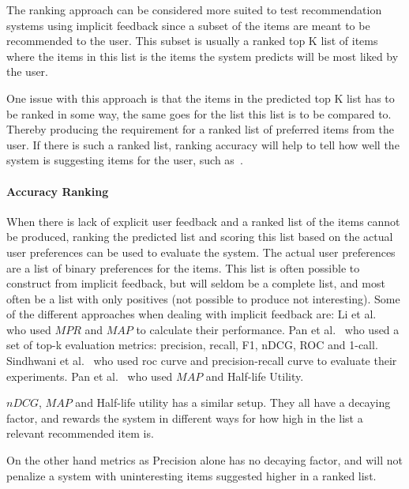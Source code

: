 The ranking approach can be considered more suited to test recommendation
systems using implicit feedback since a subset of the items are meant to be
recommended to the user.  This subset is usually a ranked top K list of items
where the items in this list is the items the system predicts will be most
liked by the user.

One issue with this approach is that the items in the predicted top K list has
to be ranked in some way, the same goes for the list this list is to be
compared to.  Thereby producing the requirement for a ranked list of preferred
items from the user.  If there is such a ranked list, ranking accuracy will
help to tell how well the system is suggesting items for the user, such
as~\cite{Yilmaz:2008:NRC:1390334.1390435}.


\paragraph{Accuracy Ranking} %
\label{par:usage_prediction}

When there is lack of explicit user feedback and a ranked list of the items
cannot be produced, ranking the predicted list and scoring this list based on
the actual user preferences can be used to evaluate the system.  The actual
user preferences are a list of binary preferences for the items.  This list is
often possible to construct from implicit feedback, but will seldom be a
complete list, and most often be a list with only positives (not possible to
produce not interesting).  Some of the different approaches when dealing with
implicit feedback are: Li et al.~\cite{deLace2010} who used $MPR$ and $MAP$ to
calculate their performance.  Pan et al.~\cite{Pan:2013:GGP:2540128.2540516}
who used a set of top-k evaluation metrics: precision, recall, F1, nDCG, ROC
and 1-call.  Sindhwani et al.~\cite{Sindhwani:2010:OMC:1933307.1934641} who
used roc curve and precision-recall curve to evaluate their experiments.  Pan
et al.~\cite{pan2008} who used $MAP$ and Half-life Utility.

$nDCG$, $MAP$ and Half-life utility has a similar setup.  They all have a
decaying factor, and rewards the system in different ways for how high in the
list a relevant recommended item is.

On the other hand metrics as Precision alone has no decaying factor, and will
not penalize a system with uninteresting items suggested higher in a ranked
list.

